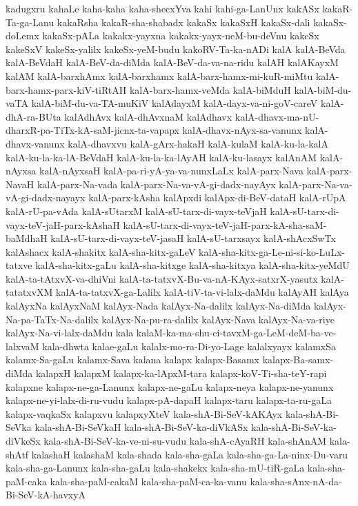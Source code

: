 {kadugxru
kahaLe
kaha-kaha
kaha-shecxYva
kahi
kahi-ga-LanUnx
kakASx
kakaR-Ta-ga-Lanu
kakaRsha
kakaR-sha-shabadx
kakaSx
kakaSxH
kakaSx-dali
kakaSx-doLemx
kakaSx-pALa
kakakx-yayxna
kakakx-yayx-neM-bu-deVnu
kakeSx
kakeSxV
kakeSx-yalilx
kakeSx-yeM-budu
kakoRV-Ta-ka-nADi
kalA
kalA-BeVda
kalA-BeVdaH
kalA-BeV-da-diMda
kalA-BeV-da-va-na-ridu
kalAH
kalAKayxM
kalAM
kalA-barxhAmx
kalA-barxhamx
kalA-barx-hamx-mi-kuR-miMtu
kalA-barx-hamx-parx-kiV-tiRtAH
kalA-barx-hamx-veMda
kalA-biMduH
kalA-biM-du-vaTA
kalA-biM-du-va-TA-muKiV
kalAdayxM
kalA-dayx-va-ni-goV-careV
kalA-dhA-ra-BUta
kalAdhAvx
kalA-dhAvxnaM
kalAdhavx
kalA-dhavx-ma-nU-dharxR-pa-TiTx-kA-saM-jicnx-ta-vapapx
kalA-dhavx-nAyx-sa-vanunx
kalA-dhavx-vanunx
kalA-dhavxvu
kalA-gArx-hakaH
kalA-kulaM
kalA-ku-la-kalA
kalA-ku-la-ka-lA-BeVdaH
kalA-ku-la-ka-lAyAH
kalA-ku-lasayx
kalAnAM
kalA-nAyxsa
kalA-nAyxsaH
kalA-pa-ri-yA-ya-va-nunxLaLx
kalA-parx-Nava
kalA-parx-NavaH
kalA-parx-Na-vada
kalA-parx-Na-va-vA-gi-dadx-nayAyx
kalA-parx-Na-va-vA-gi-dadx-nayayx
kalA-parx-kAsha
kalApxdi
kalApx-di-BeV-dataH
kalA-rUpA
kalA-rU-pa-vAda
kalA-sUtarxM
kalA-sU-tarx-di-vayx-teVjaH
kalA-sU-tarx-di-vayx-teV-jaH-parx-kAshaH
kalA-sU-tarx-di-vayx-teV-jaH-parx-kA-sha-saM-baMdhaH
kalA-sU-tarx-di-vayx-teV-jasaH
kalA-sU-tarxsayx
kalA-shAcxSwTx
kalAshacx
kalA-shakitx
kalA-sha-kitx-gaLeV
kalA-sha-kitx-ga-Le-ni-si-ko-LuLx-tatxve
kalA-sha-kitx-gaLu
kalA-sha-kitxge
kalA-sha-kitxya
kalA-sha-kitx-yeMdU
kalA-ta-tAtxvX-va-dhiVni
kalA-ta-tatxvX-Bu-va-nA-KAyx-satxrX-yasutx
kalA-tatatxvXM
kalA-ta-tatxvX-ga-Lalilx
kalA-tiV-ta-vi-lalx-daMdu
kalAyAH
kalAya
kalAyxNa
kalAyxNaM
kalAyx-Nada
kalAyx-Na-dalilx
kalAyx-Na-diMda
kalAyx-Na-pa-TaTx-Na-dalilx
kalAyx-Na-pu-ra-dalilx
kalAyx-Nava
kalAyx-Na-va-riye
kalAyx-Na-vi-lalx-daMdu
kala
kalaM-ka-ma-shu-ci-tavxM-ga-LeM-deM-ba-ve-lalxvaM
kala-dhwta
kalae-gaLu
kalalx-mo-ra-Di-yo-Lage
kalalxyayx
kalamxSa
kalamx-Sa-gaLu
kalamx-Sava
kalana
kalapx
kalapx-Basamx
kalapx-Ba-samx-diMda
kalapxH
kalapxM
kalapx-ka-lApxM-tara
kalapx-koV-Ti-sha-teY-rapi
kalapxne
kalapx-ne-ga-Lanunx
kalapx-ne-gaLu
kalapx-neya
kalapx-ne-yanunx
kalapx-ne-yi-lalx-di-ru-vudu
kalapx-pA-dapaH
kalapx-taru
kalapx-ta-ru-gaLa
kalapx-vaqkaSx
kalapxvu
kalapxyXteV
kala-shA-Bi-SeV-kAKAyx
kala-shA-Bi-SeVka
kala-shA-Bi-SeVkaH
kala-shA-Bi-SeV-ka-diVkASx
kala-shA-Bi-SeV-ka-diVkeSx
kala-shA-Bi-SeV-ka-ve-ni-su-vudu
kala-shA-cAyaRH
kala-shAnAM
kala-shAtf
kalashaH
kalashaM
kala-shada
kala-sha-gaLa
kala-sha-ga-La-ninx-Du-varu
kala-sha-ga-Lanunx
kala-sha-gaLu
kala-shakekx
kala-sha-mU-tiR-gaLa
kala-sha-paM-caka
kala-sha-paM-cakaM
kala-sha-paM-ca-ka-vanu
kala-sha-sAnx-nA-da-Bi-SeV-kA-havxyA
}
